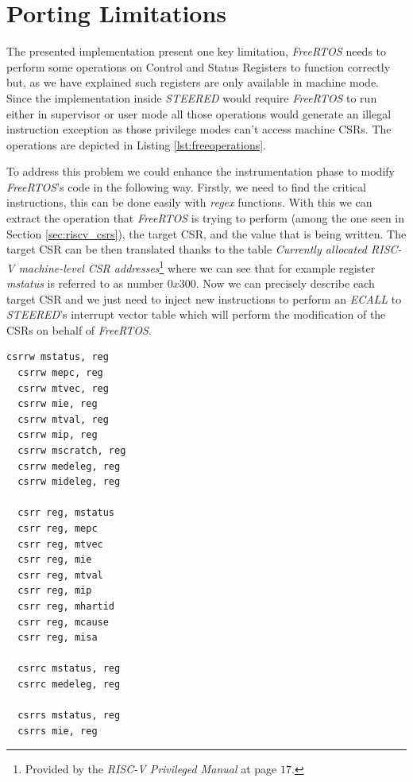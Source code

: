 \section{Porting Limitations}
\label{sec:rtos_limitations}

The presented implementation present one key limitation, \textit{FreeRTOS} needs
to perform some operations on Control and Status Registers to function correctly
but, as we have explained such registers are only available in machine mode. Since
the implementation inside \textit{STEERED} would require \textit{FreeRTOS} to run
either in supervisor or user mode all those operations would generate an illegal
instruction exception as those privilege modes can't access machine CSRs. The
operations are depicted in Listing \ref{lst:freeoperations}.

To address this problem we could enhance the instrumentation phase to modify
\textit{FreeRTOS}'s code in the following way. Firstly, we need to find the critical
instructions, this can be done easily with \textit{regex} functions. With this
we can extract the operation that \textit{FreeRTOS} is trying to perform (among
the one seen in Section \ref{sec:riscv_csrs}), the target CSR, and the value that
is being written. The target CSR can be then translated thanks to the table
\textit{Currently allocated RISC-V machine-level CSR addresses}\footnote{Provided
by the \textit{RISC-V Privileged Manual}\cite{riscv} at page $17$.} where we can
see that for example register \textit{mstatus} is referred to as number $0x300$.
Now we can precisely describe each target CSR and we just need to inject new
instructions to perform an \textit{ECALL} to \textit{STEERED}'s interrupt vector
table which will perform the modification of the CSRs on behalf of \textit{FreeRTOS}.
\\
\begin{lstlisting}[style=Assembly, caption = \textit{FreeRTOS} operations on Control and Status Registers, label={lst:freeoperations}]
  csrrw mstatus, reg
  csrrw mepc, reg
  csrrw mtvec, reg
  csrrw mie, reg
  csrrw mtval, reg
  csrrw mip, reg
  csrrw mscratch, reg
  csrrw medeleg, reg
  csrrw mideleg, reg

  csrr reg, mstatus
  csrr reg, mepc
  csrr reg, mtvec
  csrr reg, mie
  csrr reg, mtval
  csrr reg, mip
  csrr reg, mhartid
  csrr reg, mcause
  csrr reg, misa

  csrrc mstatus, reg
  csrrc medeleg, reg

  csrrs mstatus, reg
  csrrs mie, reg
\end{lstlisting}

